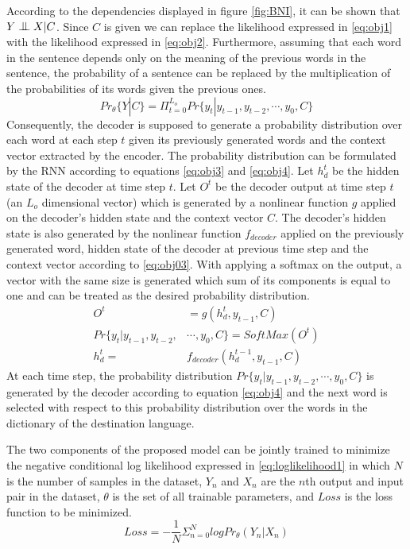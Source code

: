 \documentclass[preprint, 12pt]{elsarticle}
\newcommand{\bigCI}{\mathrel{\text{\scalebox{1.07}{$\perp\mkern-10mu\perp$}}}}
\begin{document}
		 According to the dependencies displayed in figure \ref{fig:BNI}, it can be shown that $Y  \bigCI X | C$. Since $C$ is given we can replace the likelihood expressed in \eqref{eq:obj1} with the likelihood expressed in \eqref{eq:obj2}. Furthermore, assuming that each word in the sentence depends only on the meaning of the previous words in the sentence, the probability of a sentence can be replaced by the multiplication of the probabilities of its words given the previous ones.
		\begin{equation}
			Pr_\theta\{Y | C\} = \Pi_{t=0}^{L_o} Pr\{y_t| y_{t-1}, y_{t-2}, \cdots, y_0, C\}
			\label{eq:obj2}
		\end{equation}
		Consequently, the decoder is supposed to generate a probability distribution over each word at each step $t$ given its previously generated words and the context vector extracted by the encoder. The probability distribution can be formulated by the RNN according to equations \eqref{eq:obj3} and \eqref{eq:obj4}. Let $h_d^t$ be the hidden state of the decoder at time step $t$. Let $O^t$ be the decoder output at time step $t$ (an $L_o$ dimensional vector) which is generated by a nonlinear function $g$ applied on the decoder's hidden state and the context vector $C$. The decoder's hidden state is also generated by the nonlinear function $f_{decoder}$ applied on the previously generated word, hidden state of the decoder at previous time step and the context vector according to \eqref{eq:obj03}. With applying a softmax on the output, a vector with the same size is generated which sum of its components is equal to one and can be treated as the desired probability distribution.
		\begin{align}
			O^t &= g(h_d^t, y_{t-1}, C) 			\label{eq:obj3}\\
			Pr\{y_t| y_{t-1}, y_{t-2}, &\cdots, y_0, C\} = SoftMax(O^t)
			\label{eq:obj4}\\
			h_d^t = &f_{decoder}(h_d^{t-1}, y_{t-1}, C) \label{eq:obj03} 
		\end{align}
		At each time step, the probability distribution $Pr\{y_t| y_{t-1}, y_{t-2}, \cdots, y_0, C\}$ is generated by the decoder according to equation \eqref{eq:obj4} and the next word is selected with respect to this probability distribution over the words in the dictionary of the destination language.
		
		The two components of the proposed model can be jointly trained to minimize the negative conditional log likelihood expressed in \eqref{eq:loglikelihood1} in which $N$ is the number of samples in the dataset, $Y_n$ and $X_n$ are the $n$th output and input pair in the dataset, $\theta$ is the set of all trainable parameters, and $Loss$ is the loss function to be minimized.
		\begin{equation}
			Loss = -\frac{1}{N} \Sigma_{n=0}^N log Pr_\theta(Y_n | X_n)
			\label{eq:loglikelihood1}
		\end{equation}
		
\end{document}
